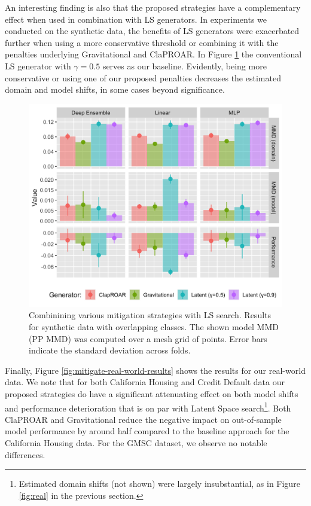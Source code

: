 \documentclass[conference,final,]{IEEEtran}
\theoremstyle{definition}
\theoremstyle{definition}
\theoremstyle{definition}
\theoremstyle{definition}
\theoremstyle{remark}
\begin{document}
An interesting finding is also that the proposed strategies have a complementary effect when used in combination with LS generators. In experiments we conducted on the synthetic data, the benefits of LS generators were exacerbated further when using a more conservative threshold or combining it with the penalties underlying Gravitational and ClaPROAR. In Figure \ref{fig:mitigate-latent-results} the conventional LS generator with \(\gamma=0.5\) serves as our baseline. Evidently, being more conservative or using one of our proposed penalties decreases the estimated domain and model shifts, in some cases beyond significance.

\begin{figure}

{\centering \includegraphics[width=0.9\linewidth]{www/mitigation_synthetic_latent_results} 

}

\caption{Combinining various mitigation strategies with LS search. Results for synthetic data with overlapping classes. The shown model MMD (PP MMD) was computed over a mesh grid of points. Error bars indicate the standard deviation across folds.}\label{fig:mitigate-latent-results}
\end{figure}

Finally, Figure \ref{fig:mitigate-real-world-results} shows the results for our real-world data. We note that for both California Housing and Credit Default data our proposed strategies do have a significant attenuating effect on both model shifts and performance deterioration that is on par with Latent Space search\footnote{Estimated domain shifts (not shown) were largely insubstantial, as in Figure \ref{fig:real} in the previous section.}. Both ClaPROAR and Gravitational reduce the negative impact on out-of-sample model performance by around half compared to the baseline approach for the California Housing data. For the GMSC dataset, we observe no notable differences.
\end{document}
